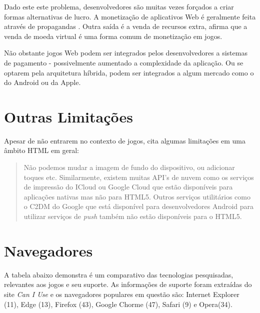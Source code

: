 Dado este este problema, desenvolvedores são muitas vezes forçados
a criar formas alternativas de lucro. A monetização de aplicativos
Web é geralmente feita através de propagandas \autocite[p.
44]{gameCommunities}. Outra saída é a venda de recursos extra,
\cite[p. 44]{gameCommunities} afirma que a venda de moeda virtual é
uma forma comum de monetização em jogos.

Não obstante jogos Web podem ser integrados pelos desenvolvedores
a sistemas de pagamento - possivelmente aumentado a complexidade
da aplicação. Ou se optarem pela arquitetura híbrida, podem ser
integrados a algum mercado como o do Android ou da Apple.

\section{Outras Limitações}

Apesar de não entrarem no contexto de jogos, \citet{html5Tradeoffs} cita
algumas limitações em uma âmbito HTML em geral:

\begin{quote}
Não podemos mudar a imagem de fundo do dispositivo, ou adicionar toques
etc. Similarmente, existem muitas API's de nuvem como os serviços
de impressão do ICloud ou Google Cloud que estão disponíveis para
aplicações nativas mas não para HTML5. Outros serviços utilitários
como o C2DM do Google que está disponível para desenvolvedores Android
para utilizar serviços de \textit{push} também não estão disponíveis
para o HTML5.
\end{quote}

\section{Navegadores}

A tabela abaixo demonstra é um comparativo das tecnologias pesquisadas,
relevantes aos jogos e seu suporte. As informações de suporte foram
extraídas do site \textit{Can I Use} e os navegadores populares em questão
são: Internet Explorer (11), Edge (13), Firefox (43), Google Chorme
(47), Safari (9) e Opera(34).

